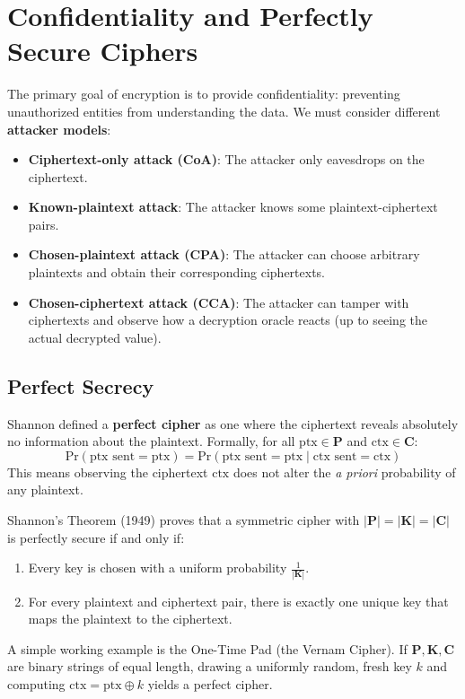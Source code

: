 \section{Confidentiality and Perfectly Secure Ciphers}

The primary goal of encryption is to provide confidentiality: preventing unauthorized entities from understanding the data. We must consider different \textbf{attacker models}:
\begin{itemize}
    \item \textbf{Ciphertext-only attack (CoA)}: The attacker only eavesdrops on the ciphertext.
    \item \textbf{Known-plaintext attack}: The attacker knows some plaintext-ciphertext pairs.
    \item \textbf{Chosen-plaintext attack (CPA)}: The attacker can choose arbitrary plaintexts and obtain their corresponding ciphertexts.
    \item \textbf{Chosen-ciphertext attack (CCA)}: The attacker can tamper with ciphertexts and observe how a decryption oracle reacts (up to seeing the actual decrypted value).
\end{itemize}

\subsection{Perfect Secrecy}
Shannon defined a \textbf{perfect cipher} as one where the ciphertext reveals absolutely no information about the plaintext. Formally, for all $\text{ptx} \in \mathbf{P}$ and $\text{ctx} \in \mathbf{C}$:
\[
\text{Pr}(\text{ptx sent} = \text{ptx}) = \text{Pr}(\text{ptx sent} = \text{ptx} \mid \text{ctx sent} = \text{ctx})
\]
This means observing the ciphertext $\text{ctx}$ does not alter the \textit{a priori} probability of any plaintext.

Shannon's Theorem (1949) proves that a symmetric cipher with $|\mathbf{P}| = |\mathbf{K}| = |\mathbf{C}|$ is perfectly secure if and only if:
\begin{enumerate}
    \item Every key is chosen with a uniform probability $\frac{1}{|\mathbf{K}|}$.
    \item For every plaintext and ciphertext pair, there is exactly one unique key that maps the plaintext to the ciphertext.
\end{enumerate}

A simple working example is the One-Time Pad (the Vernam Cipher). If $\mathbf{P}, \mathbf{K}, \mathbf{C}$ are binary strings of equal length, drawing a uniformly random, fresh key $k$ and computing $\text{ctx} = \text{ptx} \oplus k$ yields a perfect cipher. 


